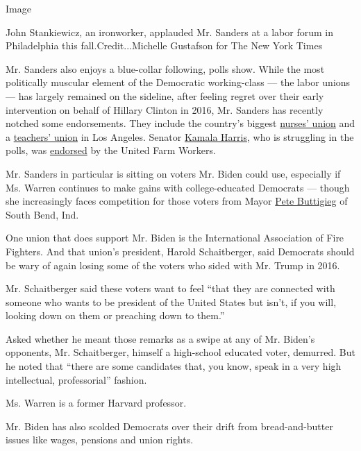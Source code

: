 Image

John Stankiewicz, an ironworker, applauded Mr. Sanders at a labor forum
in Philadelphia this fall.Credit...Michelle Gustafson for The New York
Times

Mr. Sanders also enjoys a blue-collar following, polls show. While the
most politically muscular element of the Democratic working-class ---
the labor unions --- has largely remained on the sideline, after feeling
regret over their early intervention on behalf of Hillary Clinton in
2016, Mr. Sanders has recently notched some endorsements. They include
the country's biggest
\href{https://www.nytimes.com/2019/11/12/us/politics/bernie-sanders-nurses-endorsement.html}{nurses'
union} and a
\href{https://www.washingtonpost.com/education/2019/11/15/teachers-union-los-angeles-endorses-presidential-candidate-its-bernie-sanders/}{teachers'
union} in Los Angeles. Senator
\href{https://www.nytimes.com/interactive/2020/us/elections/kamala-harris.html}{Kamala
Harris}, who is struggling in the polls, was
\href{https://www.sfchronicle.com/politics/article/Exclusive-Kamala-Harris-picks-up-major-union-14839354.php}{endorsed}
by the United Farm Workers.

Mr. Sanders in particular is sitting on voters Mr. Biden could use,
especially if Ms. Warren continues to make gains with college-educated
Democrats --- though she increasingly faces competition for those voters
from Mayor
\href{https://www.nytimes.com/interactive/2020/us/elections/pete-buttigieg.html}{Pete
Buttigieg} of South Bend, Ind.

One union that does support Mr. Biden is the International Association
of Fire Fighters. And that union's president, Harold Schaitberger, said
Democrats should be wary of again losing some of the voters who sided
with Mr. Trump in 2016.

Mr. Schaitberger said these voters want to feel ``that they are
connected with someone who wants to be president of the United States
but isn't, if you will, looking down on them or preaching down to
them.''

Asked whether he meant those remarks as a swipe at any of Mr. Biden's
opponents, Mr. Schaitberger, himself a high-school educated voter,
demurred. But he noted that ``there are some candidates that, you know,
speak in a very high intellectual, professorial'' fashion.

Ms. Warren is a former Harvard professor.

Mr. Biden has also scolded Democrats over their drift from
bread-and-butter issues like wages, pensions and union rights.

